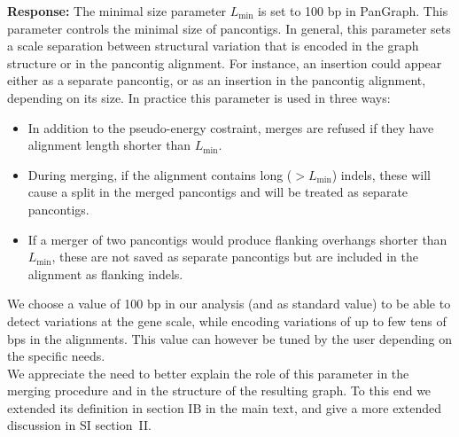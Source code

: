 \documentclass[aps,rmp,onecolumn]{revtex4-1}
\newcommand{\Lthr}{L_{\min}}
\newcommand{\response}[1]{{\it {\color{response}\textbf{Response:} #1}}\vskip 5mm}
\newcommand{\SIalgo}{II}
\begin{document}
\response{The minimal size parameter $\Lthr$ is set to 100 bp in PanGraph. This parameter controls the minimal size of pancontigs. In general, this parameter sets a scale separation between structural variation that is encoded in the graph structure or in the pancontig alignment. For instance, an insertion could appear either as a separate pancontig, or as an insertion in the pancontig alignment, depending on its size. In practice this parameter is used in three ways:
      \begin{itemize}
            \item In addition to the pseudo-energy costraint, merges are refused if they have alignment length shorter than $\Lthr$.
            \item During merging, if the alignment contains long ($> \Lthr$) indels, these will cause a split in the merged pancontigs and will be treated as separate pancontigs.
            \item If a merger of two pancontigs would produce flanking overhangs shorter than $\Lthr$, these are not saved as separate pancontigs but are included in the alignment as flanking indels.
      \end{itemize}
      We choose a value of 100 bp in our analysis (and as standard value) to be able to detect variations at the gene scale, while encoding variations of up to few tens of bps in the alignments. This value can however be tuned by the user depending on the specific needs.\\
      We appreciate the need to better explain the role of this parameter in the merging procedure and in the structure of the resulting graph. To this end we extended its definition in section IB in the main text, and give a more extended discussion in SI section~\SIalgo.\\
}
\end{document}
